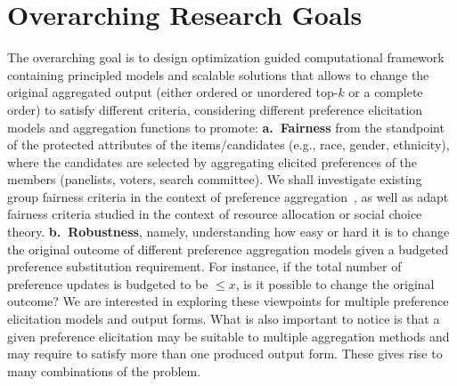 \documentclass[11pt]{article}
\begin{document}

\vspace{-0.1in}
\section{Overarching Research Goals}
\vspace{-0.1in}
The overarching goal is to design optimization guided computational framework containing principled models and scalable solutions that allows to change the original  aggregated output  (either ordered or unordered top-$k$ or a complete order) to satisfy different criteria, considering different  preference elicitation models and aggregation functions to promote:  \textbf{a.~Fairness} from the standpoint of the protected attributes\cite{verma2018fairness} of the items/candidates  %
(e.g., race, gender, ethnicity), where the candidates are selected by aggregating elicited preferences of the members (panelists, voters, search committee). We shall investigate existing group fairness criteria in the context of preference aggregation~\cite{zehlike2021fairness,verma2018fairness}, as well as adapt fairness criteria studied in the context of resource allocation or social choice theory.  \textbf{b.~Robustness}, namely, understanding how easy or hard it is to change the original outcome of different preference aggregation models given a budgeted preference substitution requirement. For instance, if the total number of preference updates is budgeted to be $\leq x$, is it possible to change the original outcome? 
 We are interested in exploring these viewpoints for multiple preference elicitation models and output forms.  What is also important to notice is that a given preference elicitation may be suitable to multiple aggregation methods and may require to satisfy more than one produced output form. These gives rise to many combinations of the problem.

\end{document}
